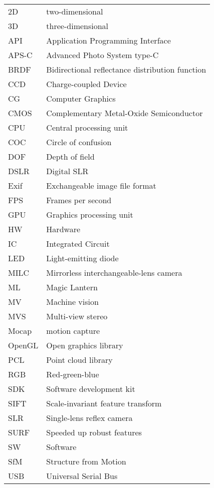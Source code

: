 \begin{tabular}{ll}
	2D & two-dimensional\\
	3D & three-dimensional\\
	API & Application Programming Interface\\
	APS-C & Advanced Photo System type-C\\
	BRDF & Bidirectional reflectance distribution function\\
	CCD & Charge-coupled Device\\
	CG & Computer Graphics\\
	CMOS & Complementary Metal-Oxide Semiconductor\\
	CPU & Central processing unit\\
	COC & Circle of confusion\\
	DOF & Depth of field\\
	DSLR & Digital SLR\\
	Exif & Exchangeable image file format\\
	FPS & Frames per second\\
	GPU & Graphics processing unit\\
	HW & Hardware\\
	IC & Integrated Circuit\\
	LED & Light-emitting diode\\
	MILC & Mirrorless interchangeable-lens camera\\
	ML & Magic Lantern\\
	MV & Machine vision\\
	MVS & Multi-view stereo\\
	Mocap & motion capture\\
	OpenGL & Open graphics library\\
	PCL & Point cloud library\\
	RGB & Red-green-blue\\
	SDK & Software development kit\\
	SIFT & Scale-invariant feature transform\\
	SLR & Single-lens reflex camera\\
	SURF & Speeded up robust features \\
	SW & Software\\
	SfM & Structure from Motion\\
	USB & Universal Serial Bus\\
\end{tabular}

